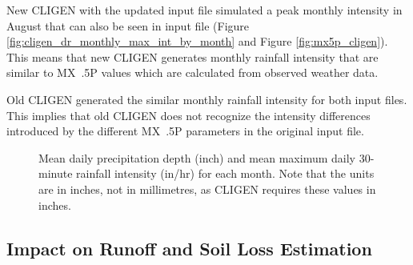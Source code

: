 New CLIGEN with the updated input file simulated a peak monthly intensity in
August that can also be seen in input file (Figure
\ref{fig:cligen_dr_monthly_max_int_by_month} and Figure \ref{fig:mx5p_cligen}).
This means that new CLIGEN generates monthly rainfall intensity that are similar
to MX~.5P values which are calculated from observed weather data.

Old CLIGEN generated the similar monthly rainfall intensity for both input
files. This implies that old CLIGEN does not recognize the intensity differences
introduced by the different MX~.5P parameters in the original input file.

\begin{figure}[htbp]
  \centering
  \caption[Mean daily precipitation depth and mean maximum daily 30-minute
rainfall intensity for each month]{Mean daily precipitation depth (inch) and
mean maximum daily 30-minute rainfall intensity (in/hr) for each month. Note
that the units are in inches, not in millimetres, as CLIGEN requires these
values in inches.}
  \label{fig:mean_p_mx5p_cligen}
\end{figure}

\subsection{Impact on Runoff and Soil Loss Estimation}

